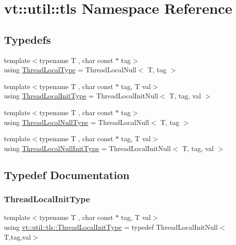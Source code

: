 \hypertarget{namespacevt_1_1util_1_1tls}{}\section{vt\+:\+:util\+:\+:tls Namespace Reference}
\label{namespacevt_1_1util_1_1tls}
\subsection*{Typedefs}
\begin{DoxyCompactItemize}
\item 
{\footnotesize template$<$typename T , char const $\ast$ tag$>$ }\\using \hyperlink{namespacevt_1_1util_1_1tls_a94b958a6b8516d7a65f5197dd7f8b8ef}{Thread\+Local\+Type} = Thread\+Local\+Null$<$ T, tag $>$
\item 
{\footnotesize template$<$typename T , char const $\ast$ tag, T val$>$ }\\using \hyperlink{namespacevt_1_1util_1_1tls_aa5ad8e27a8e4ef8e720f885d76fb26e3}{Thread\+Local\+Init\+Type} = Thread\+Local\+Init\+Null$<$ T, tag, val $>$
\item 
{\footnotesize template$<$typename T , char const $\ast$ tag$>$ }\\using \hyperlink{namespacevt_1_1util_1_1tls_aac9e7187a0a292093620b94d81a650eb}{Thread\+Local\+Null\+Type} = Thread\+Local\+Null$<$ T, tag $>$
\item 
{\footnotesize template$<$typename T , char const $\ast$ tag, T val$>$ }\\using \hyperlink{namespacevt_1_1util_1_1tls_a1c2a3e3055912db5cfa8df4b224d120c}{Thread\+Local\+Null\+Init\+Type} = Thread\+Local\+Init\+Null$<$ T, tag, val $>$
\end{DoxyCompactItemize}


\subsection{Typedef Documentation}
\mbox{\label{namespacevt_1_1util_1_1tls_aa5ad8e27a8e4ef8e720f885d76fb26e3}} 
\subsubsection{\texorpdfstring{Thread\+Local\+Init\+Type}{ThreadLocalInitType}}
{\footnotesize\ttfamily template$<$typename T , char const $\ast$ tag, T val$>$ \\
using \hyperlink{namespacevt_1_1util_1_1tls_aa5ad8e27a8e4ef8e720f885d76fb26e3}{vt\+::util\+::tls\+::\+Thread\+Local\+Init\+Type} = typedef Thread\+Local\+Init\+Null$<$T,tag,val$>$}

